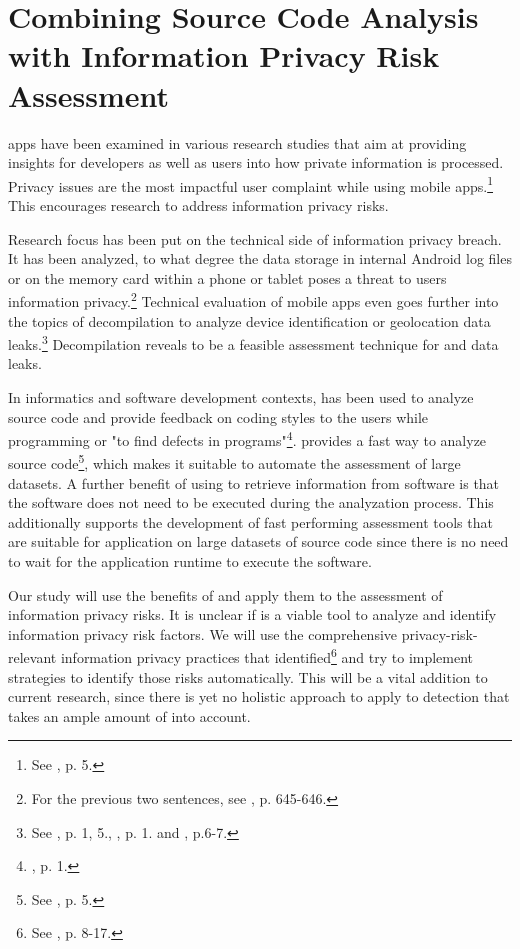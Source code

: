 \section{Combining Source Code Analysis with Information Privacy Risk Assessment}

\mH apps have been examined in various research studies that aim at providing insights for developers as well as users into how private information is processed.
Privacy issues are the most impactful user complaint while using mobile apps.\footnote{See \cite{Khalid2015}, p. 5.}
This encourages research to address information privacy risks.

Research focus has been put on the technical side of information privacy breach. 
It has been analyzed, to what degree the data storage in internal Android log files or on the memory card within a phone or tablet poses a threat to users information privacy.\footnote{For the previous two sentences, see \cite{He2014}, p. 645-646.}
Technical evaluation of mobile apps even goes further into the topics of decompilation to analyze device identification or geolocation data leaks.\footnote{See \cite{Mcclurg2012}, p. 1, 5., \cite{Enck2011}, p. 1. and \cite{Mitchell2013}, p.6-7.}
Decompilation reveals to be a feasible assessment technique for \ipr and data leaks.

In informatics and software development contexts, \sca has been used to analyze source code and provide feedback on coding styles to the users  while programming or "to find defects in programs"\footnote{\cite{Bardas2010}, p. 1.}.
\Sca provides a fast way to analyze source code\footnote{See \cite{Bardas2010}, p. 5.}, which makes it suitable to automate the assessment of large datasets.
A further benefit of using \sca to retrieve information from software is that the software does not need to be executed during the analyzation process.
This additionally supports the development of fast performing assessment tools that are suitable for application on large datasets of source code since there is no need to wait for the application runtime to execute the software.

Our study will use the benefits of \sca and apply them to the assessment of \mH information privacy risks.
It is unclear if \sca is a viable tool to analyze and identify information privacy risk factors.
We will use the comprehensive privacy-risk-relevant information privacy practices that \cite{Dehling2016} identified\footnote{See \cite{Dehling2016}, p. 8-17.} and try to implement \sca strategies to identify those risks automatically.
This will be a vital addition to current research, since there is yet no holistic approach to apply \sca to \ipr detection that takes an ample amount of \iprfs into account.

